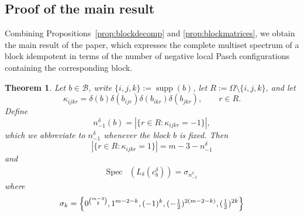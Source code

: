 \documentclass[10pt,a4paper]{amsart}
\newtheorem{theorem}{Theorem}[section]
\numberwithin{equation}{section}
\DeclareMathOperator{\supp}{supp}
\DeclareMathOperator{\Spec}{Spec}
\begin{document}
\subsection{Proof of the main result}\label{sec:localpasch}

Combining Propositions~\ref{prop:blockdecomp} and \ref{prop:blockmatrices}, we obtain the main result of the paper, which expresses the complete multiset spectrum of a block idempotent in terms of the number of negative local Pasch configurations containing the corresponding block.


\begin{theorem}\label{thm:localpaschspectrum}
Let $b\in\mathcal B$, write $\{i,j,k\}:=\supp(b)$, let $R:=\Omega\setminus\{i,j,k\}$, and let
\begin{equation}\label{kjkr}
\kappa_{ijkr}
=
\delta(b)
\delta(b_{ijr})
\delta(b_{ikr})
\delta(b_{jkr}),
\qquad
r\in R.
\end{equation}
Define
\begin{equation}\label{nminusone1}
n^{\delta}_{-1}(b)
=
|\{r\in R:\kappa_{ijkr}=-1\}|,
\end{equation}
which we abbreviate to $n^{\delta}_{-1}$ whenever the block $b$ is
fixed. Then
\begin{equation}\label{nplusrelation}
|\{r\in R:\kappa_{ijkr}=1\}| = m-3-n^{\delta}_{-1}
\end{equation}
and
\begin{equation}\label{localspectrumformula}
\begin{aligned}
\Spec&(L_\delta(c_b^\delta))=\sigma_{n^{\delta}_{-1}}
\end{aligned}
\end{equation}
where
\begin{equation}\label{sigmanot}
\sigma_k
=
\Bigl\{
0^{\binom{m-3}{2}},
1^{m-2-k},
(-1)^k,
(-\tfrac12)^{2(m-2-k)},
(\tfrac12)^{2k}
\Bigr\}
\end{equation}
\end{theorem}
\end{document}

